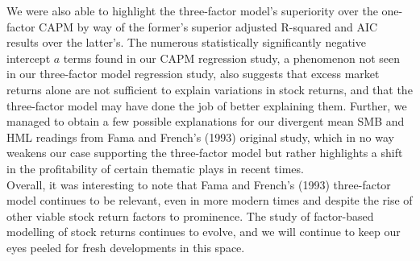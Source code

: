 \documentclass[12pt]{article}
\begin{document}
	\noindent We were also able to highlight the three-factor model's superiority over the one-factor CAPM by way of the former's superior adjusted R-squared and AIC results over the latter's. The numerous statistically significantly negative intercept $a$ terms found in our CAPM regression study, a phenomenon not seen in our three-factor model regression study, also suggests that excess market returns alone are not sufficient to explain variations in stock returns, and that the three-factor model may have done the job of better explaining them. Further, we managed to obtain a few possible explanations for our divergent mean SMB and HML readings from Fama and French's (1993) original study, which in no way weakens our case supporting the three-factor model but rather highlights a shift in the profitability of certain thematic plays in recent times.\\
	
	\noindent Overall, it was interesting to note that Fama and French's (1993) three-factor model continues to be relevant, even in more modern times and despite the rise of other viable stock return factors to prominence. The study of factor-based modelling of stock returns continues to evolve, and we will continue to keep our eyes peeled for fresh developments in this space.
\end{document}
